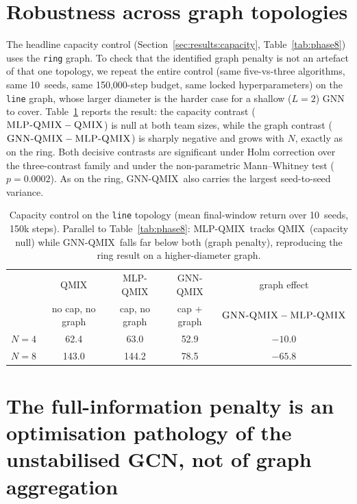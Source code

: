 \documentclass[10pt]{article}
\newcommand{\algoname}[1]{\textsc{#1}}
\newcommand{\qmix}{\algoname{QMIX}}
\newcommand{\gnnqmix}{\algoname{GNN-QMIX}}
\newcommand{\mlpqmix}{\algoname{MLP-QMIX}}
\newcommand{\PEsteps}{150{,}000}      %
\newcommand{\PEseeds}{10}             %
\newcommand{\PEmwuP}{0.0002}          %
\newcommand{\PLqmixNfour}{62.4}
\newcommand{\PLmlpNfour}{63.0}
\newcommand{\PLgnnNfour}{52.9}
\newcommand{\PLqmixNeight}{143.0}
\newcommand{\PLmlpNeight}{144.2}
\newcommand{\PLgnnNeight}{78.5}
\newcommand{\PLgraphGapNfour}{-10.0}  %
\newcommand{\PLgraphGapNeight}{-65.8} %
\begin{document}
\section{Robustness across graph topologies}
\label{app:line}

The headline capacity control (Section~\ref{sec:results:capacity},
Table~\ref{tab:phase8}) uses the \texttt{ring} graph. To check that the
identified graph penalty is not an artefact of that one topology, we
repeat the entire control (same five-vs-three algorithms, same
\PEseeds\ seeds, same \PEsteps-step budget, same locked hyperparameters)
on the \texttt{line} graph, whose larger diameter is the harder case
for a shallow ($L{=}2$) GNN to cover. Table~\ref{tab:line} reports the
result: the capacity contrast ($\mlpqmix-\qmix$) is null at both team
sizes, while the graph contrast ($\gnnqmix-\mlpqmix$) is sharply negative
and grows with $N$, exactly as on the ring. Both decisive contrasts are
significant under Holm correction over the three-contrast family and under
the non-parametric Mann--Whitney test ($p=\PEmwuP$). As on the ring,
\gnnqmix\ also carries the largest seed-to-seed variance.

\begin{table}[!ht]
  \centering
  \small
  \caption{Capacity control on the \texttt{line} topology (mean
  final-window return over \PEseeds\ seeds, 150k steps). Parallel to
  Table~\ref{tab:phase8}: \mlpqmix\ tracks \qmix\ (capacity null) while
  \gnnqmix\ falls far below both (graph penalty), reproducing the ring
  result on a higher-diameter graph.}
  \label{tab:line}
  \begin{tabular}{lcccc}
    \toprule
    & \qmix & \mlpqmix & \gnnqmix & graph effect \\
    & {\footnotesize no cap, no graph} & {\footnotesize cap, no graph}
      & {\footnotesize cap + graph} & {\footnotesize $\gnnqmix-\mlpqmix$} \\
    \midrule
    $N=4$ & \PLqmixNfour & \PLmlpNfour & \PLgnnNfour & $\PLgraphGapNfour$ \\
    $N=8$ & \PLqmixNeight & \PLmlpNeight & \PLgnnNeight & $\PLgraphGapNeight$ \\
    \bottomrule
  \end{tabular}
\end{table}

\section{The full-information penalty is an optimisation pathology of the
unstabilised GCN, not of graph aggregation}
\label{app:repaired}
\end{document}
